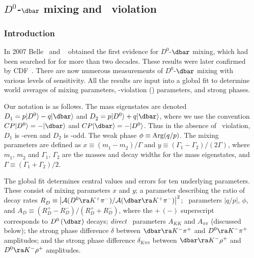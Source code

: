 \subsection{\emph{$D^0$-$\dbar$} mixing and \emph{\cp}\ violation}
\label{sec:charm:mixcpv}

\subsubsection{Introduction}

In 2007 Belle~\cite{Staric:2007dt} and \babar~\cite{Aubert:2007wf} 
obtained the first evidence for $D^0$-$\dbar$ mixing, which 
had been searched for for more than two decades. 
These results were later confirmed by CDF~\cite{Aaltonen:2007uc}.
There are now numerous measurements of $D^0$-$\dbar$ mixing 
with various levels of sensitivity. All the results are
input into a global fit to determine
world averages of mixing parameters, \cp-violation (\cpv) 
parameters, and strong phases.

Our notation is as follows.
The mass eigenstates are denoted 
$D^{}_1 = p|D^0\rangle-q|\dbar\rangle$ and
$D^{}_2 = p|D^0\rangle+q|\dbar\rangle$, 
where we use the convention 
$CP|D^0\rangle=-|\dbar\rangle$ and 
$CP|\dbar\rangle=-|D^0\rangle$. Thus in the absence of 
\cp\ violation, $D^{}_1$ is \cp-even and $D^{}_2$ is \cp-odd.
The weak phase $\phi\equiv {\rm Arg}(q/p)$.
The mixing parameters are defined as 
$x\equiv(m^{}_1-m^{}_2)/\Gamma$ and 
$y\equiv (\Gamma^{}_1-\Gamma^{}_2)/(2\Gamma)$, where 
$m^{}_1,\,m^{}_2$ and $\Gamma^{}_1,\,\Gamma^{}_2$ are
the masses and decay widths for the mass eigenstates,
and $\Gamma\equiv (\Gamma^{}_1+\Gamma^{}_2)/2$. 


The global fit determines central values and errors for
ten underlying parameters. These consist of mixing parameters
$x$ and $y$; a parameter describing the ratio of decay rates
$R^{}_D\equiv\left|{\cal A}(D^0\ra K^+\pi^-)/
              {\cal A}(\dbar\ra K^+\pi^-)\right|^2$;
\cpv\ parameters $|q/p|$, $\phi$, and
$A^{}_D\equiv (R^+_D-R^-_D)/(R^+_D+R^-_D)$, where the $+\,(-)$
superscript corresponds to $D^0\,(\dbar)$ decays; 
{\it direct\/} \cpv\ parameters $A^{}_{KK}$ and 
$A^{}_{\pi\pi}$ (discussed below); 
the strong phase difference
$\delta$ between $\dbar\ra K^-\pi^+$ and 
$D^0\ra K^-\pi^+$ amplitudes; and 
the strong phase difference $\delta^{}_{K\pi\pi}$ between 
$\dbar\ra K^-\rho^+$ and $D^0\ra K^-\rho^+$ amplitudes. 


